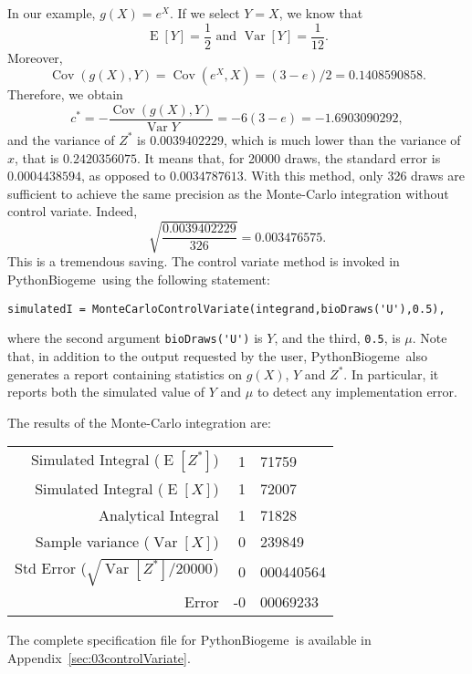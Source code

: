 \documentclass[12pt,a4paper]{article}
\newcommand{\expect}{\operatorname{E}}
\newcommand{\var}{\operatorname{Var}}
\newcommand{\cov}{\operatorname{Cov}}
\newcommand{\PBIOGEME}{PythonBiogeme}
\begin{document}
In our example, $g(X)=e^X$. If we select $Y=X$, we know that 
\begin{equation}
\expect[Y] = \frac{1}{2} \text{ and } \var[Y] = \frac{1}{12}.
\end{equation}
Moreover, 
\begin{equation}
\cov(g(X),Y) = \cov(e^X,X) = (3-e)/2 = 0.1408590858.
\end{equation}
Therefore, we obtain
\begin{equation}
c^* = -\frac{\cov(g(X),Y)}{\var{Y}} = -6(3-e) = -1.6903090292,
\end{equation}
and the variance of $Z^*$ is $0.0039402229$, which is much lower than the
variance of $x$, that is $0.2420356075$. It means that, for 20000
draws, the standard error is $0.0004438594$, as opposed to
$0.0034787613$. With this method, only 326 draws are sufficient to
achieve the same precision as the Monte-Carlo integration without
control variate.  Indeed, 
\begin{equation}
\sqrt{\frac{0.0039402229}{326}} = 0.003476575.
\end{equation}
This is a tremendous saving. The control variate method is invoked in \PBIOGEME\ using the
following statement:
\begin{lstlisting}
simulatedI = MonteCarloControlVariate(integrand,bioDraws('U'),0.5),
\end{lstlisting}
where the second argument \lstinline$bioDraws('U')$ is $Y$, and the
third, \lstinline$0.5$, is $\mu$.
Note that, in addition to the output requested by the user,
\PBIOGEME\ also generates a report containing statistics on $g(X)$, $Y$ and
$Z^*$. In particular, it reports both the simulated value of $Y$ and
$\mu$ to detect any implementation error. 

The results of the Monte-Carlo integration are:
\begin{center}
\begin{tabular}{rr@{.}l}
Simulated Integral ($\expect[Z^*]$)& 1&71759 \\
Simulated Integral ($\expect[X]$)& 1&72007 \\
Analytical Integral & 1&71828 \\
Sample variance ($\var[X]$)& 0&239849 \\
Std Error ($\sqrt{\var[Z^*]/20000}$)& 0&000440564 \\
Error & -0&00069233
\end{tabular}
\end{center}
The complete specification file for \PBIOGEME\ is available in Appendix~\ref{sec:03controlVariate}.
\end{document}
